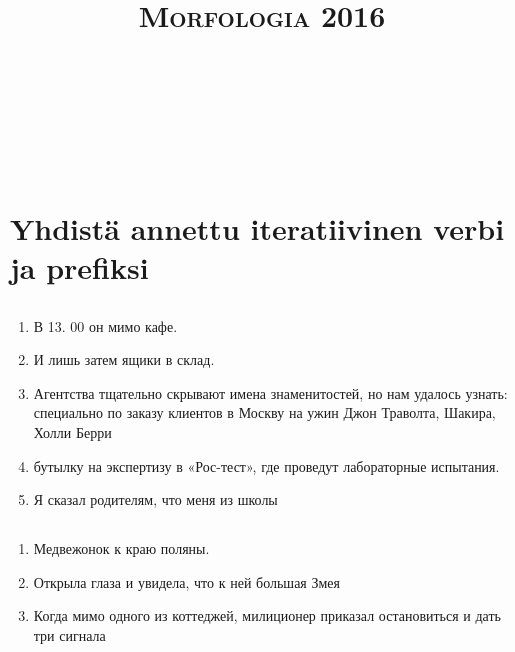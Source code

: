 \documentclass[paper=a4, fontsize=11pt]{scrartcl}
\title{	
\normalfont \normalsize 
\textsc{Morfologia 2016} \\ [25pt] %
\horrule{0.5pt} \\[0.4cm] %
\huge  \\ %
\horrule{2pt} \\[0.5cm] %
}
\date{} %
\begin{document}
\onehalfspacing
\section{Yhdistä  annettu iteratiivinen verbi ja prefiksi} 

\subsection{}

\begin{enumerate}
    \item В 13. 00 он  мимо кафе.
    \item И лишь затем  ящики в склад.
    \item Агентства тщательно скрывают имена знаменитостей, но нам удалось узнать: специально по заказу клиентов в Москву на ужин  Джон Траволта, Шакира, Холли Берри
    \item {} бутылку на экспертизу в «Рос-тест», где проведут лабораторные испытания.
    \item Я сказал родителям, что меня  из школы
\end{enumerate}

\subsection{}

\begin{enumerate}
    \item Медвежонок  к краю поляны.
    \item Открыла глаза и увидела, что к ней  большая Змея
    \item Когда  мимо одного из коттеджей, милиционер приказал остановиться и дать три сигнала
\end{enumerate}
\end{document}
